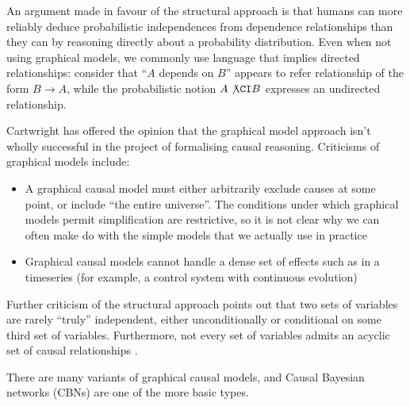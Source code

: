 An argument made in favour of the structural approach is that humans can more reliably deduce probabilistic independences from dependence relationships than they can by reasoning directly about a probability distribution. Even when not using graphical models, we commonly use language that implies directed relationships: consider that ``$A$ depends on $B$'' appears to refer relationship of the form $B\to A$, while the probabilistic notion $A\not\CI B$ expresses an undirected relationship\cite{pearl_causality:_2009}. 

Cartwright has offered the opinion that the graphical model approach isn't wholly successful in the project of formalising causal reasoning\cite{cartwright_causation:_2004}. Criticisms of graphical models include:
\begin{itemize}
    \item A graphical causal model must either arbitrarily exclude causes at some point, or include ``the entire universe''. The conditions under which graphical models permit simplification are restrictive\cite{rubenstein_causal_2017}, so it is not clear why we can often make do with the simple models that we actually use in practice
    \item Graphical causal models cannot handle a dense set of effects such as in a timeseries (for example, a control system with continuous evolution)
\end{itemize}

Further criticism of the structural approach points out that two sets of variables are rarely ``truly'' independent, either unconditionally or conditional on some third set of variables. Furthermore, not every set of variables admits an acyclic set of causal relationships \cite{gelman_causality_2011}.


There are many variants of graphical causal models, and Causal Bayesian networks (CBNs) are one of the more basic types.


